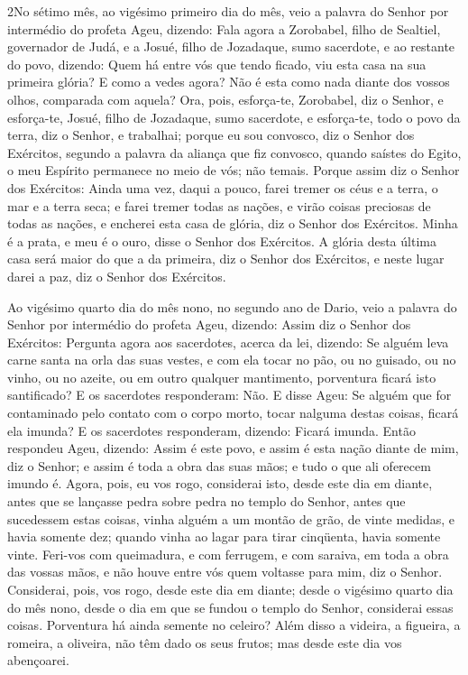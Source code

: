 \lettrine{2} No sétimo mês, ao vigésimo primeiro dia do mês,
veio a palavra do Senhor por intermédio do profeta Ageu, dizendo:
Fala agora a Zorobabel, filho de Sealtiel, governador de Judá, e
a Josué, filho de Jozadaque, sumo sacerdote, e ao restante do povo,
dizendo: Quem há entre vós que tendo ficado, viu esta casa na
sua primeira glória? E como a vedes agora? Não é esta como nada
diante dos vossos olhos, comparada com aquela? Ora, pois,
esforça-te, Zorobabel, diz o Senhor, e esforça-te, Josué, filho de
Jozadaque, sumo sacerdote, e esforça-te, todo o povo da terra, diz o
Senhor, e trabalhai; porque eu sou convosco, diz o Senhor dos
Exércitos, segundo a palavra da aliança que fiz convosco, quando
saístes do Egito, o meu Espírito permanece no meio de vós; não
temais. Porque assim diz o Senhor dos Exércitos: Ainda uma vez,
daqui a pouco, farei tremer os céus e a terra, o mar e a terra seca;
e farei tremer todas as nações, e virão coisas preciosas de
todas as nações, e encherei esta casa de glória, diz o Senhor dos
Exércitos. Minha é a prata, e meu é o ouro, disse o Senhor dos
Exércitos. A glória desta última casa será maior do que a da
primeira, diz o Senhor dos Exércitos, e neste lugar darei a paz, diz
o Senhor dos Exércitos.

Ao vigésimo quarto dia do mês nono, no segundo ano de Dario, veio
a palavra do Senhor por intermédio do profeta Ageu, dizendo:
Assim diz o Senhor dos Exércitos: Pergunta agora aos
sacerdotes, acerca da lei, dizendo: Se alguém leva carne
santa na orla das suas vestes, e com ela tocar no pão, ou no
guisado, ou no vinho, ou no azeite, ou em outro qualquer mantimento,
porventura ficará isto santificado? E os sacerdotes responderam:
Não. E disse Ageu: Se alguém que for contaminado pelo contato
com o corpo morto, tocar nalguma destas coisas, ficará ela imunda? E
os sacerdotes responderam, dizendo: Ficará imunda. Então
respondeu Ageu, dizendo: Assim é este povo, e assim é esta nação
diante de mim, diz o Senhor; e assim é toda a obra das suas mãos; e
tudo o que ali oferecem imundo é. Agora, pois, eu vos rogo,
considerai isto, desde este dia em diante, antes que se lançasse
pedra sobre pedra no templo do Senhor, antes que sucedessem
estas coisas, vinha alguém a um montão de grão, de vinte medidas, e
havia somente dez; quando vinha ao lagar para tirar cinqüenta, havia
somente vinte. Feri-vos com queimadura, e com ferrugem, e com
saraiva, em toda a obra das vossas mãos, e não houve entre vós quem
voltasse para mim, diz o Senhor. Considerai, pois, vos rogo,
desde este dia em diante; desde o vigésimo quarto dia do mês nono,
desde o dia em que se fundou o templo do Senhor, considerai essas
coisas. Porventura há ainda semente no celeiro? Além disso a
videira, a figueira, a romeira, a oliveira, não têm dado os seus
frutos; mas desde este dia vos abençoarei.

